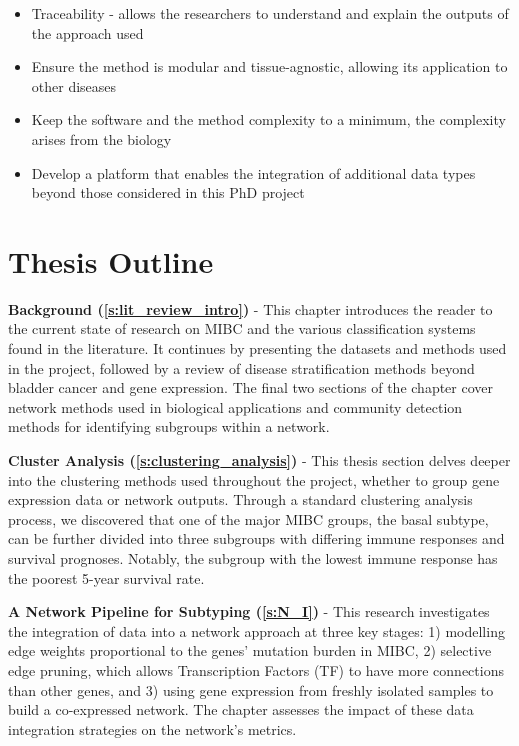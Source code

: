 \begin{itemize}
    \item Traceability - allows the researchers to understand and explain the outputs of the approach used
    \item Ensure the method is modular and tissue-agnostic, allowing its application to other diseases
    \item Keep the software and the method complexity to a minimum, the complexity arises from the biology
    \item Develop a platform that enables the integration of additional data types beyond those considered in this PhD project
\end{itemize}

\section{Thesis Outline}

\textbf{Background (\cref{s:lit_review_intro})} - This chapter introduces the reader to the current state of research on MIBC and the various classification systems found in the literature. It continues by presenting the datasets and methods used in the project, followed by a review of disease stratification methods beyond bladder cancer and gene expression. The final two sections of the chapter cover network methods used in biological applications and community detection methods for identifying subgroups within a network.


\textbf{Cluster Analysis (\cref{s:clustering_analysis})} - This thesis section delves deeper into the clustering methods used throughout the project, whether to group gene expression data or network outputs. Through a standard clustering analysis process, we discovered that one of the major MIBC groups, the basal subtype, can be further divided into three subgroups with differing immune responses and survival prognoses. Notably, the subgroup with the lowest immune response has the poorest 5-year survival rate.

\textbf{A Network Pipeline for Subtyping (\cref{s:N_I})} - This research investigates the integration of data into a network approach at three key stages: 1) modelling edge weights proportional to the genes' mutation burden in MIBC, 2) selective edge pruning, which allows Transcription Factors (TF) to have more connections than other genes, and 3) using gene expression from freshly isolated samples to build a co-expressed network. 
The chapter assesses the impact of these data integration strategies on the network's metrics.


